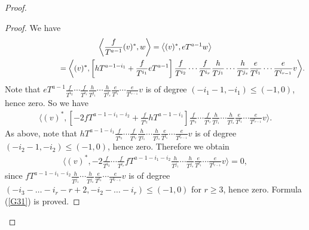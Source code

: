 \documentclass[pdftex]{sigma}
\numberwithin{equation}{section}
\begin{document}
\begin{proof}
\begin{proof}We have
\begin{gather*}
 \bigg\langle \frac{f}{T^{a-1}} (v)^*, w \bigg\rangle = \big\langle (v)^*, eT^{a-1} w \big\rangle \\
\hphantom{\bigg\langle \frac{f}{T^{a-1}} (v)^*, w \bigg\rangle} = \bigg\langle (v)^*, \left[hT^{a-1-i_1} +\frac{f}{T^{i_1}} eT^{a-1}\right]
 \frac{f}{T^{i_2}} \cdots \frac{f}{T^{i_r}} \frac{h}{T^{j_1}}\cdots\frac{h}{T^{j_s}} \frac{e}{T^{l_1}}\cdots\frac{e}{T^{l_{r-1}}} v \bigg\rangle.
\end{gather*}
Note that $eT^{a-1} \frac{f}{T^{i_2}} \cdots \frac{f}{T^{i_r}} \frac{h}{T^{j_1}}\cdots\frac{h}{T^{j_s}} \frac{e}{T^{l_1}}\cdots\frac{e}{T^{l_{r-1}}} v $ is of degree $(-i_1 - 1,-i_1) \leq (-1,0)$, hence zero. So we have
\begin{gather*}
\bigg\langle (v)^*, \left[-2 fT^{a-1-i_1-i_2} +\frac{f}{T^{i_2}} hT^{a-1-i_1} \right]
\frac{f}{T^{i_3}} \cdots \frac{f}{T^{i_r}} \frac{h}{T^{j_1}}\cdots
\frac{h}{T^{j_s}} \frac{e}{T^{l_1}}\cdots\frac{e}{T^{l_{r-1}}} v \bigg\rangle.
\end{gather*}
As above, note that $hT^{a-1-i_1} \frac{f}{T^{i_3}} \cdots \frac{f}{T^{i_r}} \frac{h}{T^{j_1}}\cdots\frac{h}{T^{j_s}} \frac{e}{T^{l_1}}\cdots\frac{e}{T^{l_{r-1}}} v $ is of degree $ (-i_2-1, -i_2) \leq (-1,0)$, hence zero. Therefore we obtain
\begin{gather*}
\bigg\langle (v)^*, -2 \frac{f}{T^{i_3}} \cdots \frac{f}{T^{i_r}} fT^{a-1-i_1-i_2} \frac{h}{T^{j_1}}\cdots\frac{h}{T^{j_s}} \frac{e}{T^{l_1}}\cdots\frac{e}{T^{l_{r-1}}} v \bigg\rangle = 0,
\end{gather*}
since $fT^{a-1-i_1-i_2} \frac{h}{T^{j_1}}\cdots\frac{h}{T^{j_s}} \frac{e}{T^{l_1}}\cdots\frac{e}{T^{l_{r-1}}} v $ is of degree $(-i_3 - \dots - i_r - r + 2, -i_2 - \dots - i_r) \leq (-1,0)$ for $r \geq 3$, hence zero. Formula (\ref{G31}) is proved.


\end{proof}
\end{proof}
\end{document}
